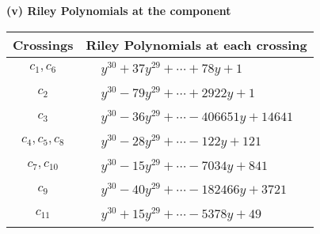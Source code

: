 \documentclass[1p]{elsarticle_modified}
\theoremstyle{definition}
\begin{document}
\flushleft \textbf{(v) Riley Polynomials at the component}\newline \\
\begin{tabular}{m{50pt}|m{274pt}}
Crossings & \hspace{64pt}Riley Polynomials at each crossing \\
\hline $$\begin{aligned}c_{1},c_{6}\end{aligned}$$&$\begin{aligned}
&y^{30}+37 y^{29}+\cdots+78 y+1
\end{aligned}$\\
\hline $$\begin{aligned}c_{2}\end{aligned}$$&$\begin{aligned}
&y^{30}-79 y^{29}+\cdots+2922 y+1
\end{aligned}$\\
\hline $$\begin{aligned}c_{3}\end{aligned}$$&$\begin{aligned}
&y^{30}-36 y^{29}+\cdots-406651 y+14641
\end{aligned}$\\
\hline $$\begin{aligned}c_{4},c_{5},c_{8}\end{aligned}$$&$\begin{aligned}
&y^{30}-28 y^{29}+\cdots-122 y+121
\end{aligned}$\\
\hline $$\begin{aligned}c_{7},c_{10}\end{aligned}$$&$\begin{aligned}
&y^{30}-15 y^{29}+\cdots-7034 y+841
\end{aligned}$\\
\hline $$\begin{aligned}c_{9}\end{aligned}$$&$\begin{aligned}
&y^{30}-40 y^{29}+\cdots-182466 y+3721
\end{aligned}$\\
\hline $$\begin{aligned}c_{11}\end{aligned}$$&$\begin{aligned}
&y^{30}+15 y^{29}+\cdots-5378 y+49
\end{aligned}$\\
\hline
\end{tabular}\\~\\
\end{document}
